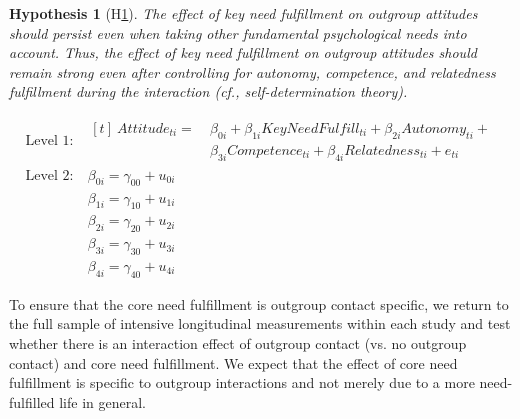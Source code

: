 \documentclass[man, 12pt, a4paper, mask]{apa7}
\theoremstyle{break}
\theoremstyle{plain}
\newtheorem{hyp}{Hypothesis}
\begin{document}
\begin{mdframed}[style=mdfhypothesis]
    \begin{hyp}[H\ref{hyp:keyNeedSDT}] \label{hyp:keyNeedSDT}
    The effect of key need fulfillment on outgroup attitudes should persist even when taking other fundamental psychological needs into account. Thus, the effect of key need fulfillment on outgroup attitudes should remain strong even after controlling for autonomy, competence, and relatedness fulfillment during the interaction (cf., self-determination theory). 
    \end{hyp}

    \begin{fleqn}[\eqskip-\subhypskip]
      \begin{equation} \label{eq:SlopesAttCoreSdt}
        \begin{split}
          \textrm{Level 1:} &
            \begin{aligned}[t]
              \ Attitude_{ti} =  &\ \beta_{0i} + \beta_{1i}KeyNeedFulfill_{ti} + \beta_{2i}Autonomy_{ti} + \\
                                 &\ \beta_{3i}Competence_{ti} + \beta_{4i}Relatedness_{ti} + e_{ti}
            \end{aligned} \\
          \textrm{Level 2:} &\ \beta_{0i} = \gamma_{00} + u_{0i} \\
                            &\ \beta_{1i} = \gamma_{10} + u_{1i} \\
                            &\ \beta_{2i} = \gamma_{20} + u_{2i} \\
                            &\ \beta_{3i} = \gamma_{30} + u_{3i} \\
                            &\ \beta_{4i} = \gamma_{40} + u_{4i}
        \end{split} 
      \end{equation}
    \end{fleqn}
\end{mdframed}

To ensure that the core need fulfillment is outgroup contact specific, we return to the full sample of intensive longitudinal measurements within each study and test whether there is an interaction effect of outgroup contact (vs. no outgroup contact) and core need fulfillment. We expect that the effect of core need fulfillment is specific to outgroup interactions and not merely due to a more need-fulfilled life in general.
\end{document}

